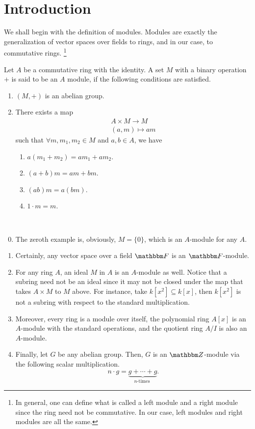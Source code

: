 \section{Introduction}
We shall begin with the definition of modules. Modules are exactly the generalization of vector spaces over fields to rings, and in our case, to commutative rings. \footnote{In general, one can define what is called a left module and a right module since the ring need not be commutative. In our case, left modules and right modules are all the same.}
\begin{definition}[Module]\label{def: module}
    Let $A$ be a commutative ring with the identity. A set $M$ with a binary operation $+$ is said to be an $A$ module, if the following conditions are satisfied.
    \begin{enumerate}
        \item $(M,+)$ is an abelian group.
        \item There exists a map
            $$
            \begin{gathered}
            A \times M \rightarrow M \\
            (a, m) \mapsto a m
            \end{gathered}
            $$
            such that \(\forall m, m_{1}, m_{2} \in M\) and \(a, b \in A\), we have
            \begin{enumerate}
                \item  $a\left(m_{1}+m_{2}\right)=a m_{1}+a m_{2}$.
                \item  $(a+b) m=a m+b m$.
                \item $(a b) m=a(b m)$.
                \item $1 \cdot m=m$.
            \end{enumerate}
    \end{enumerate}
\end{definition}
\begin{example}\ 
    \begin{enumerate}
    \setcounter{enumi}{-1}
        \item The zeroth example is, obviously, $M=\{0\}$, which is an $A$-module for any $A$.
        \item Certainly, any vector space over a field $\F$ is an $\F$-module.
        \item For any ring $A$, an ideal $M$ in $A$ is an $A$-module as well. Notice that a subring need not be an ideal since it may not be closed under the map that takes $A \times M$ to $M$ above. For instance, take $k\left[x^{2}\right] \subseteq k[x]$, then $k\left[x^{2}\right]$ is not a subring with respect to the standard multiplication. 
        \item Moreover, every ring is a module over itself, the polynomial ring $A[x]$ is an $A$-module with the standard operations, and the quotient ring $A / I$ is also an $A$-module.
        \item Finally, let $G$ be any abelian group. Then, $G$ is an $\Z$-module via the following scalar multiplication.
        $$
        n \cdot g=\underbrace{g+\cdots+g}_{n \text {-times }}.
        $$
    \end{enumerate}
\end{example}

